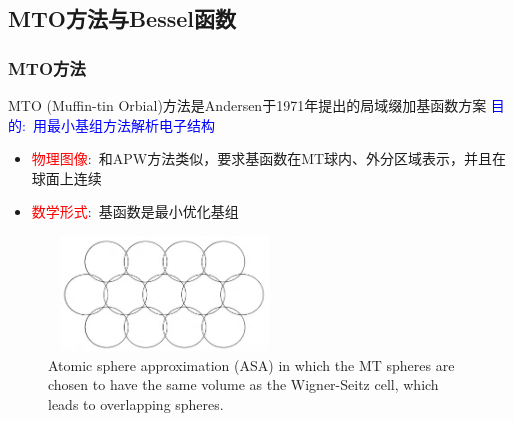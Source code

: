 {\subsection{\rm{MTO}方法与\rm{Bessel}函数}
\frame
{
\frametitle{\textrm{MTO}方法}
\textrm{MTO (Muffin-tin Orbial)}方法是\textrm{Andersen}于\textrm{1971}年提出的局域缀加基函数方案
\vskip 5pt
\textcolor{blue}{目的:~用最小基组方法解析电子结构}
\begin{itemize}
	\item \textcolor{red}{物理图像}:~和\textrm{APW}方法类似，要求基函数在\textrm{MT}球内、外分区域表示，并且在球面上连续
	\item \textcolor{red}{数学形式}:~基函数是最小优化基组
\end{itemize}
\begin{figure}[h!]
	\vspace{-5pt}
\centering
\includegraphics[height=1.20in,width=2.42in,viewport=5 0 1005 495,clip]{Figures/Atomic_sphere-appro.png}
\caption{\fontsize{6.2pt}{4.2pt}\selectfont\textrm{Atomic sphere approximation (ASA) in which the MT spheres are chosen to have the same volume as the Wigner-Seitz cell, which leads to overlapping spheres.}}
\label{Atomic_sphere-appro}
\end{figure}
}

}
